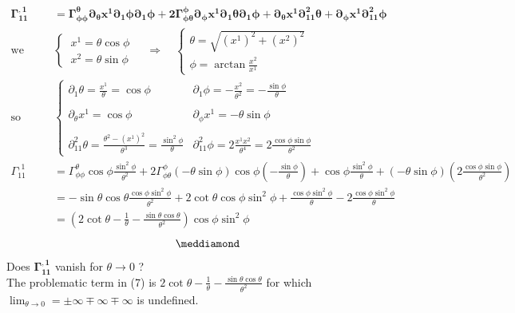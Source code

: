 \begin{align}
\boldsymbol{\Gamma_{11}^{,1}} &=\boldsymbol{\Gamma_{\phi\phi}^{\theta}\partial_{\theta}{x^{1}}\partial_{1}\phi\partial_{1}\phi+ 2\Gamma_{\phi\theta}^{\phi}\partial_{\phi}{x^{1}}\partial_{1}\theta\partial_{1}\phi+\partial_{\theta}{x^{1}}\partial^2_{11}{\theta}+\partial_{\phi}{x^{1}}\partial^2_{11}{\phi}}\\
\text{we have}\quad & \left \{ \begin{array}{l}
\ x^1 = \theta\cos\phi\\
\ x^2 = \theta\sin\phi\
\end{array}\right. \quad \Rightarrow \quad \left \{ \begin{array}{l}
\theta = \sqrt{(x^1)^2+(x^2)^2}\\
\phi = \arctan \frac{x^2}{x^1}
\end{array}\right.\\
\text{so}\ &\left \{ \begin{array}{ll}
\partial_{1} \theta = \frac{x^1}{\theta} = \cos\phi & \partial_{1} \phi = -\frac{x^2}{\theta^2} = -\frac{\sin\phi}{\theta}  \\\\
\partial_{\theta} x^1 = \cos\phi & \partial_{\phi} x^1 = -\theta\sin\phi\\\\
\partial^2_{11} \theta = \frac{\theta^2 -(x^1)^2}{\theta ^3} = \frac{\sin^2\phi}{\theta} & \partial^2_{11} \phi =2\frac{x^1 x^2}{\theta^4}= 2\frac{\cos\phi \sin\phi}{\theta^2}
\end{array}\right.\\
\Gamma_{11}^{,1} &=\Gamma_{\phi\phi}^{\theta}\cos\phi\frac{\sin^2\phi}{\theta^2}+ 2\Gamma_{\phi\theta}^{\phi}(-\theta\sin\phi)\cos\phi(-\frac{\sin\phi}{\theta} )+\cos\phi\frac{\sin^2\phi}{\theta}+(-\theta\sin\phi)(2\frac{\cos\phi \sin\phi}{\theta^2})\\
\ &= -\sin\theta\cos\theta\frac{\cos\phi \sin^2\phi}{\theta^2}+ 2\cot\theta\cos\phi\sin^2\phi+\frac{\cos\phi\sin^2\phi}{\theta}-2\frac{\cos\phi \sin^2\phi}{\theta}\\
\ &= (2\cot\theta -\frac{1}{\theta}-\frac{\sin\theta\cos\theta}{\theta^2})\cos\phi\sin^2\phi
\end{align}
$$\meddiamond$$
\newpage
Does $\boldsymbol{\Gamma_{11}^{,1}}$ vanish for $\theta \rightarrow0$ ? \\The problematic term in (7) is $2\cot\theta -\frac{1}{\theta}-\frac{\sin\theta\cos\theta}{\theta^2}$ for which $\lim_{\theta \to 0 }= \pm \infty \mp \infty \mp \infty$ is undefined. 
